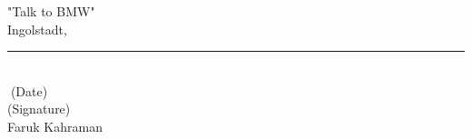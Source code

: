 


"Talk to BMW"\\ 
	
Ingolstadt, \rule{0.3\textwidth}{0.4pt}	\\
\textcolor{white}{.}\qquad\qquad\qquad\qquad\quad \small (Date) \\ [1.3cm]
	
(Signature) \\
Faruk Kahraman
